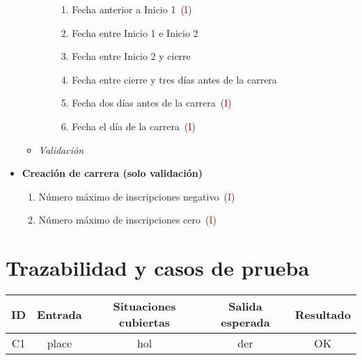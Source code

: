 \begin{itemize}
\begin{itemize}
\begin{enumerate}[label*=SPI\arabic*.]
\begin{enumerate}[label*=\arabic*]
						\item Fecha anterior a Inicio 1~(\textcolor{red}{I})
						\item Fecha entre Inicio 1 e Inicio 2
						\item Fecha entre Inicio 2 y cierre
						\item Fecha entre cierre y tres días antes de la carrera
						\item Fecha dos días antes de la carrera~(\textcolor{red}{I})
						\item Fecha el día de la carrera~(\textcolor{red}{I})
					\end{enumerate}
				\end{enumerate}
			\item \textit{Validación}
		\end{itemize}
	\item \textbf{Creación de carrera (solo validación)}
		 \begin{enumerate}[label=SCV\arabic*.]
			\item Número máximo de inscripciones negativo~(\textcolor{red}{I})
			\item Número máximo de inscripciones cero~(\textcolor{red}{I})
		 \end{enumerate}
\end{itemize}

\section{Trazabilidad y casos de prueba}
\begin{table}[ht]
	\centering
	\begin{tabular}{|c|c|c|c|c|}
		\hline
		\textbf{ID} & \textbf{Entrada} & \textbf{Situaciones cubiertas} & \textbf{Salida esperada} & \textbf{Resultado} \\
		\hline
		C1 & place & hol & der & \cellcolor{green!25} OK \\
		\hline
	\end{tabular}
\end{table}
